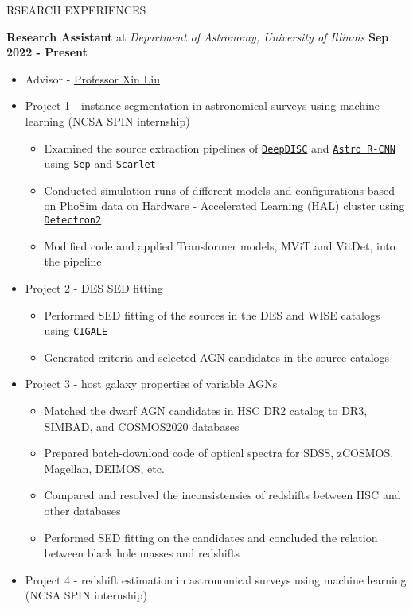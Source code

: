 \documentclass[10pt]{article} %
\begin{document}
\begin{section}{RSEARCH EXPERIENCES}

\textbf{Research Assistant} at \textit{Department of Astronomy, University of Illinois} \hfill \textbf{Sep 2022 - Present} 
\begin{itemize}[leftmargin=1.5em]
    \item Advisor - \href{mailto:xinliuxl@illinois.edu}{Professor Xin Liu}
    \item Project 1 - instance segmentation in astronomical surveys using machine learning (NCSA SPIN internship) %
    \begin{itemize}[leftmargin=1.5em]
        \item Examined the source extraction pipelines of \href{https://github.com/burke86/deepdisc}{\texttt{DeepDISC}} and \href{https://github.com/burke86/astro_rcnn}{\texttt{Astro R-CNN}} using \href{https://github.com/kbarbary/sep/tree/v1.1.x}{\texttt{Sep}} and \href{https://github.com/pmelchior/scarlet}{\texttt{Scarlet}}
        \item Conducted simulation runs of different models and configurations based on PhoSim data on Hardware - Accelerated Learning (HAL) cluster using \href{https://github.com/facebookresearch/detectron2}{\texttt{Detectron2}}
        \item Modified code and applied Transformer models, MViT and VitDet, into the pipeline
    \end{itemize}
    \item Project 2 - DES SED fitting %
    \begin{itemize}[leftmargin=1.5em]
        \item Performed SED fitting of the sources in the DES and WISE catalogs using \href{https://cigale.lam.fr/}{\texttt{CIGALE}} 
        \item Generated criteria and selected AGN candidates in the source catalogs
    \end{itemize}
    \item Project 3 - host galaxy properties of variable AGNs %
    \begin{itemize}[leftmargin=1.5em]
        \item Matched the dwarf AGN candidates in HSC DR2 catalog to DR3, SIMBAD, and COSMOS2020 databases 
        \item Prepared batch-download code of optical spectra for SDSS, zCOSMOS, Magellan, DEIMOS, etc. 
        \item Compared and resolved the inconsistensies of redshifts between HSC and other databases
        \item Performed SED fitting on the candidates and concluded the relation between black hole masses and redshifts
    \end{itemize}
    \item Project 4 - redshift estimation in astronomical surveys using machine learning (NCSA SPIN internship)
\end{itemize}


\end{section}
\end{document}
